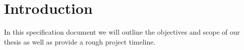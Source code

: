 \chapter{Introduction}
\label{chap:introduction}
In this specification document we will outline the objectives and scope of our thesis as well as provide a rough project timeline.

